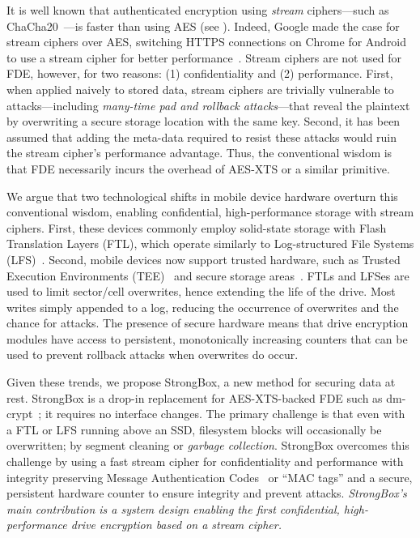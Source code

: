 It is well known that authenticated encryption using \emph{stream}
ciphers---such as ChaCha20~\cite{ChaCha20}---is faster than using AES (see
). Indeed, Google made the case for stream ciphers over AES,
switching HTTPS connections on Chrome for Android to use a stream cipher for
better performance~\cite{google-blog}. Stream ciphers are not used for FDE,
however, for two reasons: (1) confidentiality and (2) performance. First, when
applied naively to stored data, stream ciphers are trivially vulnerable to
attacks---including \emph{many-time pad and rollback attacks}---that reveal the
plaintext by overwriting a secure storage location with the same key. Second, it
has been assumed that adding the meta-data required to resist these attacks
would ruin the stream cipher's performance advantage. Thus, the conventional
wisdom is that FDE necessarily incurs the overhead of AES-XTS or a similar
primitive.

We argue that two technological shifts in mobile device hardware overturn this
conventional wisdom, enabling confidential, high-performance storage with stream
ciphers. First, these devices commonly employ solid-state storage with Flash
Translation Layers (FTL), which operate similarly to Log-structured File Systems
(LFS)~\cite{LFS,F2FS,NILFS}. Second, mobile devices now support trusted
hardware, such as Trusted Execution Environments (TEE)~\cite{TEE,TrustZone} and
secure storage areas~\cite{eMMC-standard}. FTLs and LFSes are used to limit
sector/cell overwrites, hence extending the life of the drive. Most writes
simply appended to a log, reducing the occurrence of overwrites and the chance
for attacks. The presence of secure hardware means that drive encryption modules
have access to persistent, monotonically increasing counters that can be used to
prevent rollback attacks when overwrites do occur.

Given these trends, we propose StrongBox, a new method for securing data at
rest. StrongBox is a drop-in replacement for AES-XTS-backed FDE such as
dm-crypt~\cite{dmcrypt}; \ie it requires no interface changes. The primary
challenge is that even with a FTL or LFS running above an SSD, filesystem blocks
will occasionally be overwritten; \eg by segment cleaning or \emph{garbage
collection}. StrongBox overcomes this challenge by using a fast stream cipher
for confidentiality and performance with integrity preserving Message
Authentication Codes~\cite{MAC} or ``MAC tags'' and a secure, persistent
hardware counter to ensure integrity and prevent attacks. \emph{StrongBox's main
contribution is a system design enabling the first confidential, high-
performance drive encryption based on a stream cipher.}

